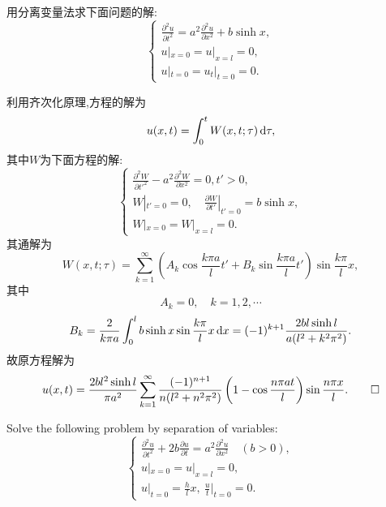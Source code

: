 \begin{exercise}
  用分离变量法求下面问题的解:
  \[\begin{cases}
    \frac{\partial^2u}{\partial t^2} = a^2 \frac{\partial^2u}{\partial x^2} + b\sinh x, \\
    u|_{x=0} = u|_{x=l} = 0, \\
    u|_{t=0} = u_t|_{t=0} = 0.
  \end{cases}\]
\end{exercise}

\begin{solve}
  利用齐次化原理,方程的解为
  \[u(x,t)=\int_0^tW(x,t;\tau)\mathop{}\!\mathrm{d}\tau,\]
  其中$W$为下面方程的解:
  \[\begin{cases}
    \frac{\partial^2W}{\partial t'^2}-a^2\frac{\partial^2W}{\partial x^2}=0,t'>0, \\
    W|_{t'=0} = 0,\quad\frac{\partial W}{\partial t'}|_{t'=0} = b\sinh x, \\
    W|_{x=0} = W|_{x=l} = 0.
  \end{cases}\]
  其通解为
  \[W(x,t;\tau) = \sum_{k=1}^{\infty}\left(A_k\cos\frac{k\pi a}{l}t'
    + B_k\sin\frac{k\pi a}{l}t'\right)\sin\frac{k\pi}{l}x,\]
  其中
  \[A_k = 0,\quad k=1,2,\cdots\]
  \[B_k = \frac{2}{k\pi a}\int_0^l b\sinh x\sin\frac{k\pi}{l}x\mathop{}\!\mathrm{d} x
    = (-1)^{k+1}\frac{2bl\sinh l}{a(l^2+k^2\pi^2)}.\]
  故原方程解为
  \[ u(x,t) = \frac{2bl^2\sinh l}{\pi a^2}
      \sum_{k=1}^{\infty}\frac{(-1)^{n+1}}{n(l^2+n^2\pi^2)}
      \left(1-\cos\frac{n\pi at}{l}\right)\sin\frac{n\pi x}{l}. \qedhere \]
\end{solve}


\begin{exercise}
  Solve the following problem by separation of variables:
  \[\begin{cases}
    \frac{\partial^2 u}{\partial t^2} + 2b \frac{\partial u}{\partial t}
      = a^2 \frac{\partial^2u}{\partial x^2} \quad (b>0), \\
    u|_{x=0} = u|_{x=l} = 0, \\
    u|_{t=0} = \frac{h}{l}x,\ \frac{u}{t}\big|_{t=0} = 0.
  \end{cases}\]
\end{exercise}


